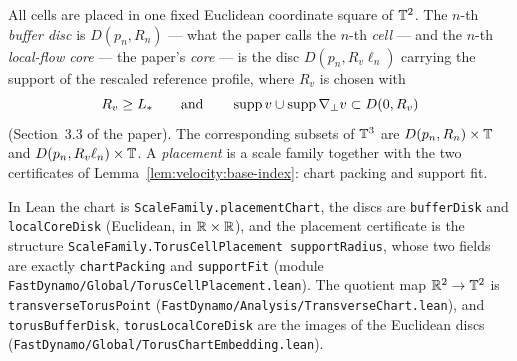 \begin{definition}
  \label{def:velocity:placement}
  \leanok
  All cells are placed in one fixed Euclidean coordinate square of $\mathbb{T}^2 $.  The $n $-th
  \emph{buffer disc} is $D(p_n,R_n) $ --- what the paper calls the $n $-th \emph{cell}
  --- and the $n $-th \emph{local-flow core} --- the paper's \emph{core} --- is the disc
  $D(p_n,R_v\ell_n) $ carrying the support of the rescaled reference profile, where $R_v $ is
  chosen with
  \[
    R_v\geq L_*
    \qquad\text{and}\qquad
    \operatorname{supp} v\cup\operatorname{supp}\nabla_\perp v\subset D(0,R_v)
  \]
  (Section~3.3 of the paper).  The corresponding subsets
  of $\mathbb{T}^3 $ are $D(p_n,R_n)\times\mathbb{T} $ and $D(p_n,R_v\ell_n)\times\mathbb{T} $.  A \emph{placement}
  is a scale family together with the two certificates of
  Lemma~\ref{lem:velocity:base-index}: chart packing and support fit.
\end{definition}

In Lean the chart is \texttt{ScaleFamily.placementChart}, the discs are
\texttt{bufferDisk} and \texttt{localCoreDisk} (Euclidean, in $\mathbb{R}\times\mathbb{R} $), and the
placement certificate is the structure \texttt{ScaleFamily.TorusCellPlacement
supportRadius}, whose two fields are exactly \texttt{chartPacking} and
\texttt{supportFit} (module \texttt{FastDynamo/Global/TorusCellPlacement.lean}).  The
quotient map $\mathbb{R}^2\to\mathbb{T}^2 $ is \texttt{transverseTorusPoint}
(\texttt{FastDynamo/Analysis/TransverseChart.lean}), and \texttt{torusBufferDisk},
\texttt{torusLocalCoreDisk} are the images of the Euclidean discs
(\texttt{FastDynamo/Global/TorusChartEmbedding.lean}).

